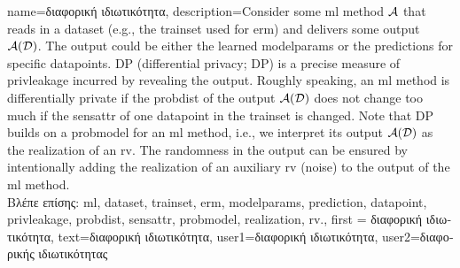 {name={\foreignlanguage{greek}{διαφορική ιδιωτικότητα}},
  description={Consider some \gls{ml} method $\mathcal{A}$ that reads in a \gls{dataset} (e.g., the \gls{trainset} 
  	used for \gls{erm}) and delivers some output $\mathcal{A}(\mathcal{D})$. The output 
  	could be either the learned \gls{modelparams} or the \gls{prediction}s for specific \gls{datapoint}s. 
  	DP (differential privacy; DP) is a precise measure of \gls{privleakage} incurred by revealing the 
  	output. Roughly speaking, an \gls{ml} method is differentially private if the \gls{probdist} 
  	of the output $\mathcal{A}(\mathcal{D})$ does not change too much if the \gls{sensattr} 
  	of one \gls{datapoint} in the \gls{trainset} is changed. Note that DP 
  	builds on a \gls{probmodel} for an \gls{ml} method, i.e., we interpret its output $\mathcal{A}(\mathcal{D})$ 
  	as the \gls{realization} of an \gls{rv}. The randomness in the output can be ensured 
  	by intentionally adding the \gls{realization} of an auxiliary \gls{rv} (noise) to 
  	the output of the \gls{ml} method.\\
	\foreignlanguage{greek}{Βλέπε επίσης:} \gls{ml}, \gls{dataset}, \gls{trainset}, \gls{erm}, \gls{modelparams}, \gls{prediction}, \gls{datapoint}, \gls{privleakage}, \gls{probdist}, \gls{sensattr}, \gls{probmodel}, \gls{realization}, \gls{rv}.}, 
	first = {\foreignlanguage{greek}{διαφορική ιδιωτικότητα}},
	text={\foreignlanguage{greek}{διαφορική ιδιωτικότητα}},
	user1={\foreignlanguage{greek}{διαφορική ιδιωτικότητα}}, %
   	user2={\foreignlanguage{greek}{διαφορικής ιδιωτικότητας}} %
}

